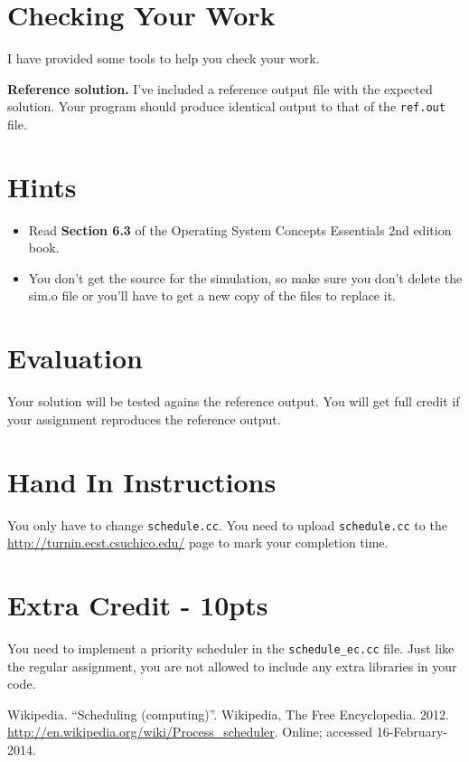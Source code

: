 \documentclass[11pt]{article}
\begin{document}
\section*{Checking Your Work}

I have provided some tools to help you check your work.

{\bf Reference solution.} I've included a reference output file with the expected solution. Your program should produce identical output to that of the {\tt ref.out} file. 

\section*{Hints}

\begin{itemize}
\item Read {\bf Section 6.3} of the Operating System Concepts Essentials 2nd edition
book. 
\item You don't get the source for the simulation, so make sure you don't delete the sim.o file or you'll have to get a new copy of the files to replace it. 

\end{itemize}

\section*{Evaluation}

Your solution will be tested agains the reference output. You will get full credit if your assignment reproduces the reference output. 

\section*{Hand In Instructions}

You only have to change {\tt schedule.cc}.  You need to upload
 {\tt schedule.cc} to the \url{http://turnin.ecst.csuchico.edu/} page to mark your completion
time.

\section*{Extra Credit - 10pts}

You need to implement a priority scheduler in the {\tt schedule\_ec.cc} file. Just like the regular assignment, you are not allowed to include any extra libraries in your code. 

\begin{thebibliography}{3}

 Wikipedia.
  \newblock ``Scheduling (computing)''.
  \newblock Wikipedia, The Free Encyclopedia. 2012.
  \newblock
  \url{http://en.wikipedia.org/wiki/Process_scheduler}.
  \newblock Online; accessed 16-February-2014.

\end{thebibliography}
\end{document}
